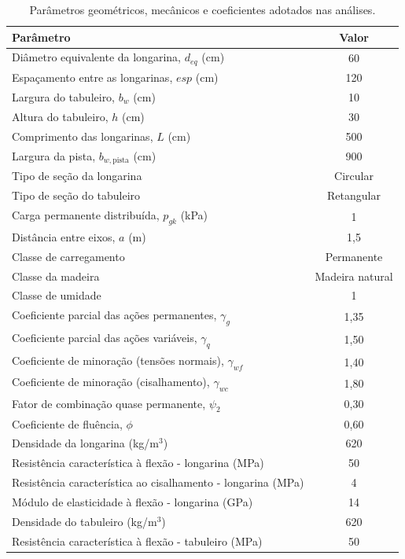 \clearpage
\begin{table}[htpb!]
    \centering
    \caption{Parâmetros geométricos, mecânicos e coeficientes adotados nas análises.}
    \label{tab:parametros_fixos}

    \fontsize{11pt}{13.2pt}\selectfont
    \begin{tabular}{lc}
        \toprule
        \textbf{Parâmetro} & \textbf{Valor} \\ \midrule
        Diâmetro equivalente da longarina, $d_{eq}$ (cm) & 60 \\
        Espaçamento entre as longarinas, $esp$ (cm) & 120 \\
        Largura do tabuleiro, $b_w$ (cm) & 10 \\
        Altura do tabuleiro, $h$ (cm) & 30 \\
        Comprimento das longarinas, $L$ (cm) & 500 \\
        Largura da pista, $b_{w,\text{pista}}$ (cm) & 900 \\
        Tipo de seção da longarina & Circular \\
        Tipo de seção do tabuleiro & Retangular \\
        Carga permanente distribuída, $p_{gk}$ (kPa) & 1 \\
        Distância entre eixos, $a$ (m) & 1{,}5 \\
        Classe de carregamento & Permanente \\
        Classe da madeira & Madeira natural \\
        Classe de umidade & 1 \\
        Coeficiente parcial das ações permanentes, $\gamma_g$ & 1{,}35 \\
        Coeficiente parcial das ações variáveis, $\gamma_q$ & 1{,}50 \\
        Coeficiente de minoração (tensões normais), $\gamma_{wf}$ & 1{,}40 \\
        Coeficiente de minoração (cisalhamento), $\gamma_{wc}$ & 1{,}80 \\
        Fator de combinação quase permanente, $\psi_2$ & 0{,}30 \\
        Coeficiente de fluência, $\phi$ & 0{,}60 \\
        Densidade da longarina (kg/m$^3$) & 620 \\
        Resistência característica à flexão - longarina (MPa) & 50 \\
        Resistência característica ao cisalhamento - longarina (MPa) & 4 \\
        Módulo de elasticidade à flexão - longarina (GPa) & 14 \\
        Densidade do tabuleiro (kg/m$^3$) & 620 \\
        Resistência característica à flexão - tabuleiro (MPa) & 50 \\ \bottomrule
    \end{tabular}


\end{table}

